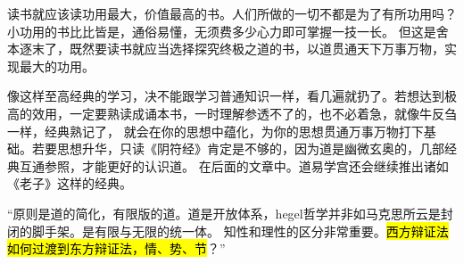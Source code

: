\begin{shadequote}
读书就应该读功用最大，价值最高的书。人们所做的一切不都是为了有所功用吗？小功用的书比比皆是，通俗易懂，无须费多少心力即可掌握一技一长。
但这是舍本逐末了，既然要读书就应当选择探究终极之道的书，以道贯通天下万事万物，实现最大的功用。

像这样至高经典的学习，决不能跟学习普通知识一样，看几遍就扔了。若想达到极高的效用，一定要熟读成诵本书，一时理解参透不了的，也不必着急，就像牛反刍一样，经典熟记了，
就会在你的思想中蕴化，为你的思想贯通万事万物打下基础。若要思想升华，只读《阴符经》肯定是不够的，因为道是幽微玄奥的，几部经典互通参照，才能更好的认识道。
在后面的文章中。道易学宫还会继续推出诸如《老子》这样的经典。
\end{shadequote}


\enquote{原则是道的简化，有限版的道。道是开放体系，hegel哲学并非如马克思所云是封闭的脚手架。是有限与无限的统一体。
知性和理性的区分非常重要。\hl{西方辩证法如何过渡到东方辩证法，情、势、节}？}
